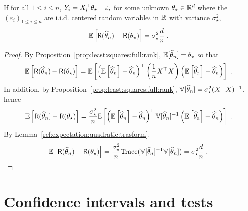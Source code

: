 \begin{proposition}
If for all $1\leqslant i \leqslant n$, $Y_i = X^\top_i \theta_{\star} + \varepsilon_i$ for some unknown $\theta_\star\in\mathbb{R}^d$ where the $(\varepsilon_i)_{1\leqslant i\leqslant n}$ are i.i.d. centered random variables in $\mathbb{R}$ with variance $\sigma_\star^2$, 
$$
\mathbb{E}\left[\mathsf{R}(\widehat {\theta}_n) - \mathsf{R}(\theta_\star)\right] = \sigma_\star^2 \frac{d}{n}\;.
$$
\end{proposition}

\begin{proof}
By Proposition~\ref{prop:least:squares:full:rank}, $\mathbb{E}[\widehat {\theta}_n] = \theta_\star$ so that 
$$
\mathbb{E}\left[\mathsf{R}(\widehat {\theta}_n) - \mathsf{R}(\theta_\star)\right] = \mathbb{E}\left[ \left(\mathbb{E}\left[\widehat {\theta}_n\right] - \widehat {\theta}_n\right)^\top \left(\frac{1}{n}X^\top X\right) \left(\mathbb{E}\left[\widehat {\theta}_n\right] - \widehat {\theta}_n\right)\right]\;.
$$
In addition, by Proposition~\ref{prop:least:squares:full:rank}, $\mathbb{V}[\widehat {\theta}_n] = \sigma_\star^2(X^\top X)^{-1}$, hence
$$
\mathbb{E}\left[\mathsf{R}(\widehat {\theta}_n) - \mathsf{R}(\theta_\star)\right] = \frac{\sigma_\star^2}{n}\mathbb{E}\left[ \left(\mathbb{E}\left[\widehat {\theta}_n\right] - \widehat {\theta}_n\right)^\top \mathbb{V}[\widehat {\theta}_n]^{-1} \left(\mathbb{E}\left[\widehat {\theta}_n\right] - \widehat {\theta}_n\right)\right]\;.
$$
By Lemma~\ref{ref:expectation:quadratic:trasform},
$$
\mathbb{E}\left[\mathsf{R}(\widehat {\theta}_n) - \mathsf{R}(\theta_\star)\right] = \frac{\sigma_\star^2}{n}\mathrm{Trace}(\mathbb{V}[\widehat {\theta}_n]^{-1}\mathbb{V}[\widehat {\theta}_n]) = \sigma_\star^2 \frac{d}{n}\;.
$$
\end{proof}

\section{Confidence intervals and tests}
